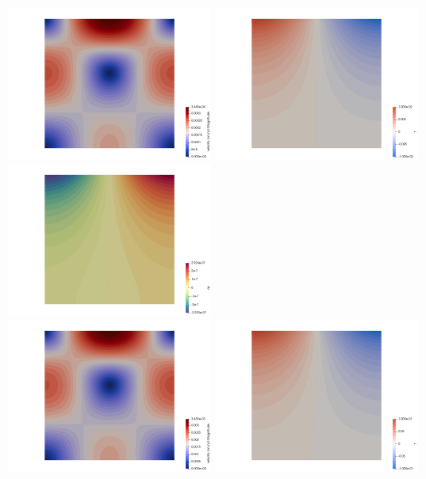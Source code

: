 \begin{center}
\includegraphics[height=4cm]{python_codes/fieldstone_38/results/T0_0p01_64x64/vel}
\includegraphics[height=4cm]{python_codes/fieldstone_38/results/T0_0p01_64x64/T}
\includegraphics[height=4cm]{python_codes/fieldstone_38/results/T0_0p01_64x64/qy}\\
\includegraphics[height=4cm]{python_codes/fieldstone_38/results/T0_0p1_64x64/vel}
\includegraphics[height=4cm]{python_codes/fieldstone_38/results/T0_0p1_64x64/T}

\end{center}
